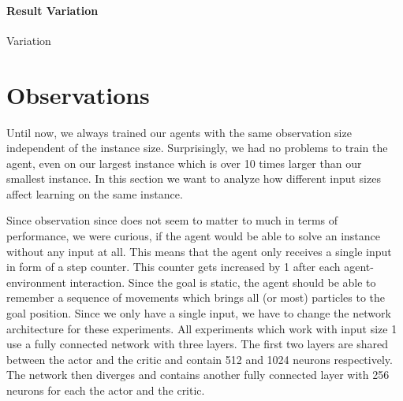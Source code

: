 \paragraph{Result Variation}
Variation

\section{Observations} \label{sec:EvalObs}
Until now, we always trained our agents with the same observation size independent of the instance size. Surprisingly, we had no problems to train the agent, even on our largest instance which is over 10 times larger than our smallest instance. In this section we want to analyze how different input sizes affect learning on the same instance. 

Since observation since does not seem to matter to much in terms of performance, we were curious, if the agent would be able to solve an instance without any input at all. This means that the agent only receives a single input in form of a step counter. This counter gets increased by 1 after each agent-environment interaction. Since the goal is static, the agent should be able to remember a sequence of movements which brings all (or most) particles to the goal position. Since we only have a single input, we have to change the network architecture for these experiments. All experiments which work with input size 1 use a fully connected network with three layers. The first two layers are shared between the actor and the critic and contain 512 and 1024 neurons respectively. The network then diverges and contains another fully connected layer with 256 neurons for each the actor and the critic.



